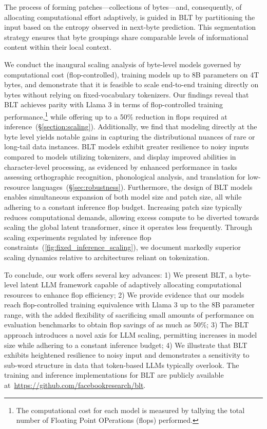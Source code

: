 The process of forming patches—collections of bytes—and, consequently, of allocating computational effort adaptively, is guided in {\textsc BLT} by partitioning the input based on the entropy observed in next-byte prediction. This segmentation strategy ensures that byte groupings share comparable levels of informational content within their local context.

We conduct the inaugural scaling analysis of byte-level models governed by computational cost (flop-controlled), training models up to 8B parameters on 4T bytes, and demonstrate that it is feasible to scale end-to-end training directly on bytes without relying on fixed-vocabulary tokenizers. Our findings reveal that {\textsc BLT} achieves parity with Llama 3 in terms of flop-controlled training performance,\footnote{The computational cost for each model is measured by tallying the total number of Floating Point OPerations (flops) performed.} while offering up to a 50\% reduction in flops required at inference~(\S\ref{section:scaling}). Additionally, we find that modeling directly at the byte level yields notable gains in capturing the distributional nuances of rare or long-tail data instances. {\textsc BLT} models exhibit greater resilience to noisy inputs compared to models utilizing tokenizers, and display improved abilities in character-level processing, as evidenced by enhanced performance in tasks assessing orthographic recognition, phonological analysis, and translation for low-resource languages~(\S\ref{sec:robustness}). Furthermore, the design of {\textsc BLT} models enables simultaneous expansion of both model size and patch size, all while adhering to a constant inference flop budget. Increasing patch size typically reduces computational demands, allowing excess compute to be diverted towards scaling the global latent transformer, since it operates less frequently. Through scaling experiments regulated by inference flop constraints~(\autoref{fig:fixed_inference_scaling}), we document markedly superior scaling dynamics relative to architectures reliant on tokenization.

To conclude, our work offers several key advances: 1) We present {\textsc BLT}, a byte-level latent LLM framework capable of adaptively allocating computational resources to enhance flop efficiency; 2) We provide evidence that our models reach flop-controlled training equivalence with Llama 3 up to the 8B parameter range, with the added flexibility of sacrificing small amounts of performance on evaluation benchmarks to obtain flop savings of as much as 50\%; 3) The {\textsc BLT} approach introduces a novel axis for LLM scaling, permitting increases in model size while adhering to a constant inference budget; 4) We illustrate that {\textsc BLT} exhibits heightened resilience to noisy input and demonstrates a sensitivity to sub-word structure in data that token-based LLMs typically overlook. The training and inference implementations for {\textsc BLT} are publicly available at~\url{https://github.com/facebookresearch/blt}.

